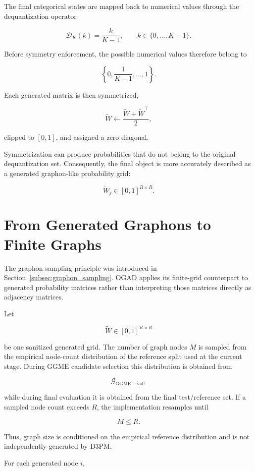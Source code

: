 The final categorical states are mapped back to numerical values through the dequantization operator

\[
\mathcal{D}_K(k)
=
\frac{k}{K-1},
\qquad
k\in\{0,\ldots,K-1\}.
\]

Before symmetry enforcement, the possible numerical values therefore belong to

\[
\left\{
0,
\frac{1}{K-1},
\ldots,
1
\right\}.
\]

Each generated matrix is then symmetrized,

\[
\widetilde{W}
\leftarrow
\frac{
\widetilde{W}
+
\widetilde{W}^{\top}
}{2},
\]

clipped to \([0,1]\), and assigned a zero diagonal.

Symmetrization can produce probabilities that do not belong to the original dequantization set. Consequently, the final object is more accurately described as a generated graphon-like probability grid:

\[
\widetilde{W}_j
\in
[0,1]^{R\times R}.
\]


\section{From Generated Graphons to Finite Graphs}
\label{sec:method_graph_sampling}

The graphon sampling principle was introduced in Section~\ref{subsec:graphon_sampling}. OGAD applies its finite-grid counterpart to generated probability matrices rather than interpreting those matrices directly as adjacency matrices.

Let

\[
\widetilde{W}
\in
[0,1]^{R\times R}
\]

be one sanitized generated grid. The number of graph nodes \(M\) is sampled from the empirical node-count distribution of the reference split used at the current stage. During GGME candidate selection this distribution is obtained from

\[
\mathcal{G}_{\mathrm{GGME-val}},
\]

while during final evaluation it is obtained from the final test/reference set. If a sampled node count exceeds \(R\), the implementation resamples until

\[
M\leq R.
\]

Thus, graph size is conditioned on the empirical reference distribution and is not independently generated by D3PM.

For each generated node \(i\),


